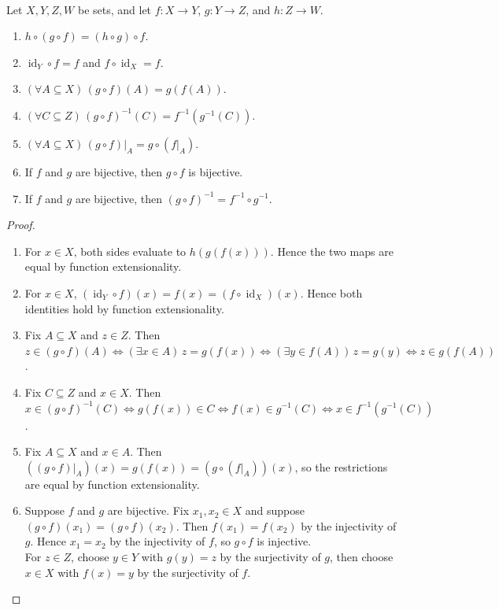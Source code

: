 \begin{proposition} \label{prop:composition-restriction-calculus} \\
Let $X,Y,Z,W$ be sets, and let $f:X\to Y$, $g:Y\to Z$, and $h:Z\to W$.
\begin{enumerate}[label=(\roman*)]
\setlength{\itemsep}{0pt}
\item $h\circ(g\circ f)=(h\circ g)\circ f$.
\item $\operatorname{id}_Y\circ f=f$ and $f\circ\operatorname{id}_X=f$.
\item $(\forall A\subseteq X)\,(g\circ f)(A)=g(f(A))$.
\item $(\forall C\subseteq Z)\,(g\circ f)^{-1}(C)=f^{-1}(g^{-1}(C))$.
\item $(\forall A\subseteq X)\,(g\circ f)|_A=g\circ(f|_A)$.
\item If $f$ and $g$ are bijective, then $g\circ f$ is bijective.
\item If $f$ and $g$ are bijective, then $(g\circ f)^{-1}=f^{-1}\circ g^{-1}$.
\end{enumerate}
\begin{proof}
\begin{enumerate}[label=(\roman*)]
\setlength{\itemsep}{0pt}
\item For $x\in X$, both sides evaluate to $h(g(f(x)))$. Hence the two maps are equal by function extensionality.
\item For $x\in X$, $(\operatorname{id}_Y\circ f)(x)=f(x)=(f\circ\operatorname{id}_X)(x)$. Hence both identities hold by function extensionality.
\item Fix $A\subseteq X$ and $z\in Z$. Then $z\in(g\circ f)(A)\Longleftrightarrow(\exists x\in A)\,z=g(f(x))\Longleftrightarrow(\exists y\in f(A))\,z=g(y)\Longleftrightarrow z\in g(f(A))$.
\item Fix $C\subseteq Z$ and $x\in X$. Then $x\in(g\circ f)^{-1}(C)\Longleftrightarrow g(f(x))\in C\Longleftrightarrow f(x)\in g^{-1}(C)\Longleftrightarrow x\in f^{-1}(g^{-1}(C))$.
\item Fix $A\subseteq X$ and $x\in A$. Then $((g\circ f)|_A)(x)=g(f(x))=(g\circ(f|_A))(x)$, so the restrictions are equal by function extensionality.
\item Suppose $f$ and $g$ are bijective. Fix $x_1,x_2\in X$ and suppose $(g\circ f)(x_1)=(g\circ f)(x_2)$. Then $f(x_1)=f(x_2)$ by the injectivity of $g$. Hence $x_1=x_2$ by the injectivity of $f$, so $g\circ f$ is injective.\\
For $z\in Z$, choose $y\in Y$ with $g(y)=z$ by the surjectivity of $g$, then choose $x\in X$ with $f(x)=y$ by the surjectivity of $f$.\\

\end{enumerate}
\end{proof}
\end{proposition}
